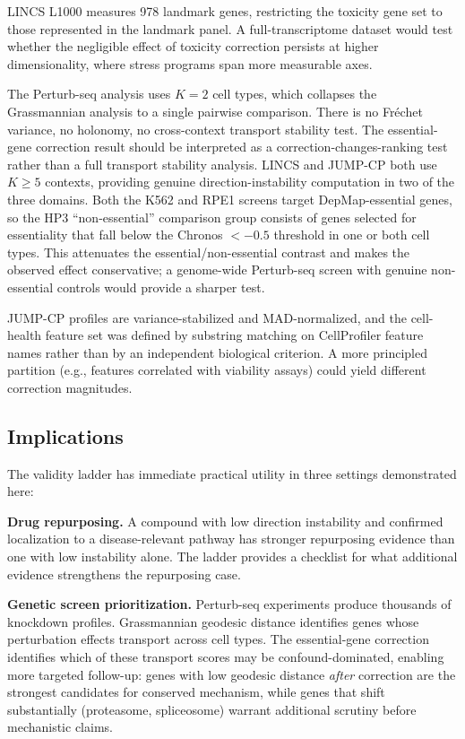 \documentclass{article}
\begin{document}
LINCS L1000 measures 978 landmark genes, restricting the toxicity gene set to
those represented in the landmark panel. A full-transcriptome dataset would
test whether the negligible effect of toxicity correction persists at higher
dimensionality, where stress programs span more measurable axes.

The Perturb-seq analysis uses $K = 2$ cell types, which collapses the
Grassmannian analysis to a single pairwise comparison. There is no Fr\'echet
variance, no holonomy, no cross-context transport stability test. The
essential-gene correction result should be interpreted as a
correction-changes-ranking test rather than a full transport stability
analysis. LINCS and JUMP-CP both use $K \geq 5$ contexts, providing
genuine direction-instability computation in two of the three domains.
Both the K562 and RPE1 screens target DepMap-essential genes, so the
HP3 ``non-essential'' comparison group consists of genes selected for
essentiality that fall below the Chronos $< -0.5$ threshold in one or
both cell types. This attenuates the essential/non-essential contrast and
makes the observed effect conservative; a genome-wide Perturb-seq screen
with genuine non-essential controls would provide a sharper test.

JUMP-CP profiles are variance-stabilized and MAD-normalized, and the
cell-health feature set was defined by substring matching on CellProfiler
feature names rather than by an independent biological criterion. A more
principled partition (e.g., features correlated with viability assays)
could yield different correction magnitudes.

\subsection{Implications}

The validity ladder has immediate practical utility in three settings
demonstrated here:

\textbf{Drug repurposing.} A compound with low direction instability and
confirmed localization to a disease-relevant pathway has stronger repurposing
evidence than one with low instability alone. The ladder provides a checklist
for what additional evidence strengthens the repurposing case.

\textbf{Genetic screen prioritization.} Perturb-seq experiments produce
thousands of knockdown profiles. Grassmannian geodesic distance identifies
genes whose perturbation effects transport across cell types. The
essential-gene correction identifies which of these transport scores may be
confound-dominated, enabling more targeted follow-up: genes with low
geodesic distance \emph{after} correction are the strongest candidates for
conserved mechanism, while genes that shift substantially (proteasome,
spliceosome) warrant additional scrutiny before mechanistic claims.
\end{document}

